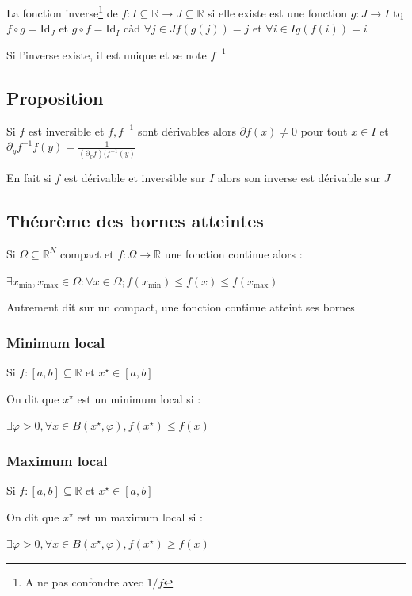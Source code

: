 \documentclass[a4paper,10pt]{article}
\newcommand{\ap}{\rightarrow}
\newcommand{\R}{\mathbb{R}}
\newcommand{\Id}{\mbox{Id}}
\begin{document}
La fonction inverse\footnote{A ne pas confondre avec $1/f$} de $f : I \subseteq \R \ap J \subseteq \R$ si elle existe est une fonction $g : J \ap I$ tq $f \circ g = \Id_J$ et $g \circ f = \Id_I$ càd $\forall j \in J f(g(j)) = j$ et $\forall i \in I g(f(i)) = i$

Si l'inverse existe, il est unique et se note $f^{-1}$

\subsection{Proposition}

Si $f$ est inversible et $f,f^{-1}$ sont dérivables alors $\partial f(x) \neq 0$ pour tout $x \in I$ et $\partial_y f^{-1} f(y) = \frac{1}{(\partial_x f)(f^{-1}(y)}$

En fait si $f$ est dérivable et inversible sur $I$ alors son inverse est dérivable sur $J$

\subsection{Théorème des bornes atteintes}

Si $\Omega \subseteq \R^N$ compact et $f : \Omega \ap \R$ une fonction continue alors :

$\exists x_{\min}, x_{\max} \in \Omega : \forall x \in \Omega ; f(x_{\min}) \leq f(x) \leq f(x_{\max})$

Autrement dit sur un compact, une fonction continue atteint ses bornes

\subsubsection{Minimum local}

Si $f: [ a, b ] \subseteq \R$ et $x^\star \in [a,b]$

On dit que $x^\star$ est un minimum local si :

$\exists \varphi > 0, \forall x \in B(x^\star,\varphi), f(x^\star) \leq f(x)$

\subsubsection{Maximum local}

Si $f: [ a, b ] \subseteq \R$ et $x^\star \in [a,b]$

On dit que $x^\star$ est un maximum local si :

$\exists \varphi > 0, \forall x \in B(x^\star,\varphi), f(x^\star) \geq f(x)$
\end{document}
